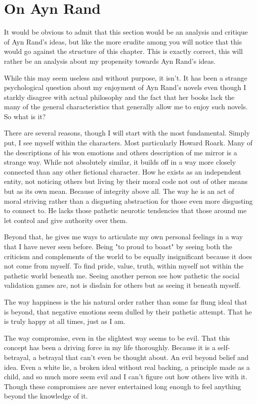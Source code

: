\section{On Ayn Rand}
\par It would be obvious to admit that this section would be an analysis and critique of Ayn Rand's ideas, but like the more erudite among you will notice that this would go against the structure of this chapter. This is exactly correct, this will rather be an analysis about my propensity towards Ayn Rand's ideas.
\par While this may seem useless and without purpose, it isn't. It has been a strange psychological question about my enjoyment of Ayn Rand's novels even though I starkly disagree with actual philosophy and the fact that her books lack the many of the general characteristics that generally allow me to enjoy such novels. So what is it?
\par There are several reasons, though I will start with the most fundamental. Simply put, I see myself within the characters. Most particularly Howard Roark. Many of the descriptions of his won emotions and others description of me mirror is a strange way. While not absolutely similar, it builds off in a way more closely connected than any other fictional character. How he exists as an independent entity, not noticing others but living by their moral code not out of other means but as its own mean. Because of integrity above all. The way he is an act of moral striving rather than a disgusting abstraction for those even more disgusting to connect to. He lacks those pathetic neurotic tendencies that those around me let control and give authority over them.
\par Beyond that, he gives me ways to articulate my own personal feelings in a way that I have never seen before. Being "to proud to boast" by seeing both the criticism and complements of the world to be equally insignificant because it does not come from myself. To find pride, value, truth, within myself not within the pathetic world beneath me. Seeing another person see how pathetic the social validation games are, not is disdain for others but as seeing it beneath myself.
\par The way happiness is the his natural order rather than some far flung ideal that is beyond, that negative emotions seem dulled by their pathetic attempt. That he is truly happy at all times, just as I am.
\par The way compromise, even in the slightest way seems to be evil. That this concept has been a driving force in my life thoroughly. Because it is a self-betrayal, a betrayal that can't even be thought about. An evil beyond belief and idea. Even a white lie, a broken ideal without real backing, a principle made as a child, and so much more seem evil and I can't figure out how others live with it. Though these compromises are never entertained long enough to feel anything beyond the knowledge of it.
